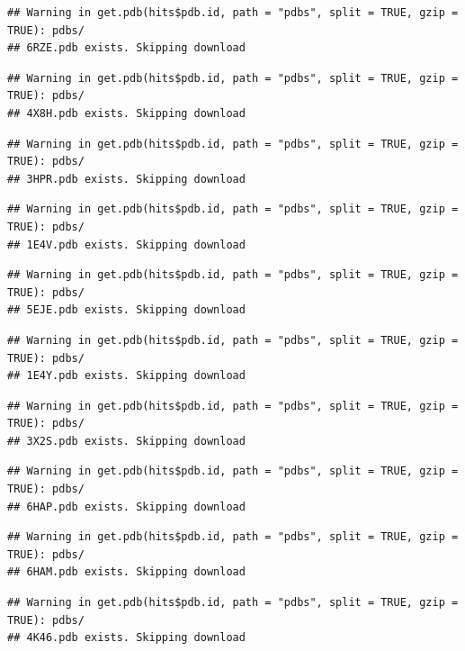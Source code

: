 \documentclass[
]{article}
\begin{document}
\begin{verbatim}
## Warning in get.pdb(hits$pdb.id, path = "pdbs", split = TRUE, gzip = TRUE): pdbs/
## 6RZE.pdb exists. Skipping download
\end{verbatim}

\begin{verbatim}
## Warning in get.pdb(hits$pdb.id, path = "pdbs", split = TRUE, gzip = TRUE): pdbs/
## 4X8H.pdb exists. Skipping download
\end{verbatim}

\begin{verbatim}
## Warning in get.pdb(hits$pdb.id, path = "pdbs", split = TRUE, gzip = TRUE): pdbs/
## 3HPR.pdb exists. Skipping download
\end{verbatim}

\begin{verbatim}
## Warning in get.pdb(hits$pdb.id, path = "pdbs", split = TRUE, gzip = TRUE): pdbs/
## 1E4V.pdb exists. Skipping download
\end{verbatim}

\begin{verbatim}
## Warning in get.pdb(hits$pdb.id, path = "pdbs", split = TRUE, gzip = TRUE): pdbs/
## 5EJE.pdb exists. Skipping download
\end{verbatim}

\begin{verbatim}
## Warning in get.pdb(hits$pdb.id, path = "pdbs", split = TRUE, gzip = TRUE): pdbs/
## 1E4Y.pdb exists. Skipping download
\end{verbatim}

\begin{verbatim}
## Warning in get.pdb(hits$pdb.id, path = "pdbs", split = TRUE, gzip = TRUE): pdbs/
## 3X2S.pdb exists. Skipping download
\end{verbatim}

\begin{verbatim}
## Warning in get.pdb(hits$pdb.id, path = "pdbs", split = TRUE, gzip = TRUE): pdbs/
## 6HAP.pdb exists. Skipping download
\end{verbatim}

\begin{verbatim}
## Warning in get.pdb(hits$pdb.id, path = "pdbs", split = TRUE, gzip = TRUE): pdbs/
## 6HAM.pdb exists. Skipping download
\end{verbatim}

\begin{verbatim}
## Warning in get.pdb(hits$pdb.id, path = "pdbs", split = TRUE, gzip = TRUE): pdbs/
## 4K46.pdb exists. Skipping download
\end{verbatim}
\end{document}
